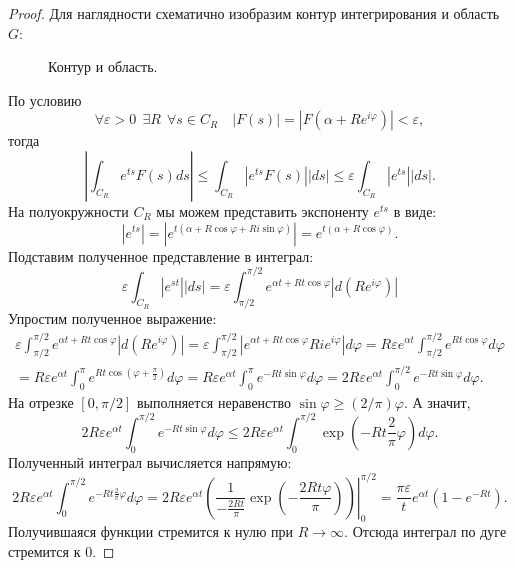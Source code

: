 \documentclass[../paper.tex]{subfile}
\begin{document}
\begin{proof}
Для наглядности схематично изобразим контур интегрирования и область $G$:

\begin{figure}[!ht]
	\centering
	
	\caption{Контур и область.}
\end{figure}

По условию
\[
	\forall \varepsilon > 0 \ \  \exists R \ \ \forall s \in C_R \quad \left| F(s) \right| = \left| F\left(\alpha + Re^{i\varphi}\right) \right|  < \varepsilon
,\] тогда
\[
	\left|\int_{C_R} e^{ts} F(s) ds\right|
	\le \int_{C_R} \left|e^{ts} F(s)\right| |ds|
	\le \varepsilon \int_{C_R} \left|e^{ts}\right| |ds|
.\]
На полуокружности $C_R$ мы можем представить экспоненту $e^{ts}$ в виде:
\[
	\left|e^{ts}\right|
	= \left|e^{t\left(\alpha+R\cos\varphi+Ri\sin\varphi\right)}\right|
	= e^{t\left(\alpha + R\cos\varphi\right)}
.\]
Подставим полученное представление в интеграл:
\[
	\varepsilon \int_{C_R} \left|e^{st}\right| |ds|
	= \varepsilon \int_{\pi/2}^{\pi/2} e^{\alpha t + R t \cos \varphi} \left|d\left(Re^{i\varphi}\right)\right|
\]
Упростим полученное выражение:
\begin{multline*}
	\varepsilon \int_{\pi/2}^{\pi/2} e^{\alpha t + R t \cos \varphi} \left|d\left(Re^{i\varphi}\right)\right|
	= \varepsilon \int_{\pi/2}^{\pi/2} \left|e^{\alpha t + R t \cos \varphi} R i e^{i\varphi} \right| d\varphi
	= R\varepsilon e^{\alpha t} \int_{\pi/2}^{\pi/2} e^{R t \cos\varphi} d\varphi
	\\= R\varepsilon e^{\alpha t} \int_{0}^{\pi} e^{R t \cos \left(\varphi + \frac{\pi}{2}\right)} d\varphi
	= R\varepsilon e^{\alpha t} \int_{0}^{\pi} e^{-R t \sin\varphi} d\varphi
	= 2R\varepsilon e^{\alpha t} \int_{0}^{\pi/2} e^{-R t \sin\varphi} d\varphi
.\end{multline*}
На отрезке $[0, \pi/2]$ выполняется неравенство $\sin\varphi \ge (2/\pi) \varphi$.
А значит,
\[
	2R\varepsilon e^{\alpha t} \int_{0}^{\pi/2} e^{-R t \sin\varphi} d\varphi
	\le 2R\varepsilon e^{\alpha t} \int_{0}^{\pi/2} \exp\left(-R t \frac{2}{\pi}\varphi\right) d\varphi
.\]
Полученный интеграл вычисляется напрямую:
\[
	2R\varepsilon e^{\alpha t} \int_{0}^{\pi/2} e^{-R t \frac{2}{\pi}\varphi} d\varphi
	= 2R\varepsilon e^{\alpha t} \left.\left( \frac{1}{-\frac{2Rt}{\pi}} \exp\left(- \frac{2 R t \varphi}{\pi}\right) \right) \right|_0^{\pi/2} 
        = \frac{\pi\varepsilon}{t} e^{\alpha t} \left(1 - e^{- R t} \right)
.\]
Получившаяся функции стремится к нулю при $R \to \infty$.
Отсюда интеграл по дуге стремится к $0$.
\end{proof}
\end{document}
